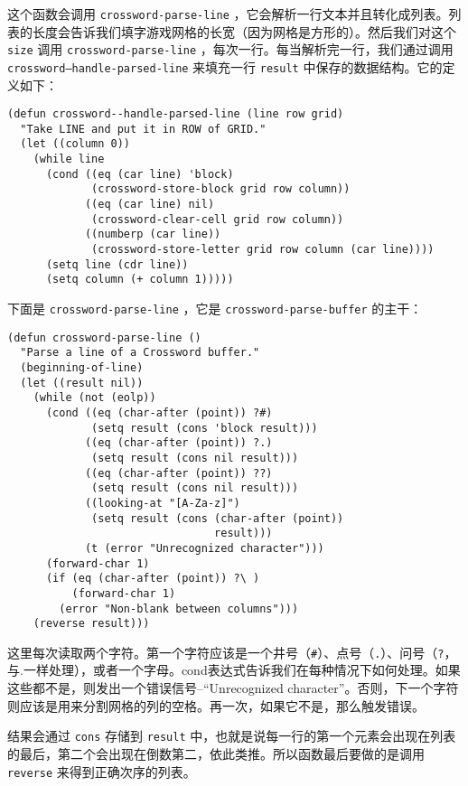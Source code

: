 这个函数会调用 \texttt{crossword-parse-line} ，它会解析一行文本并且转化成列表。列表的长度会告诉我们填字游戏网格的长宽（因为网格是方形的）。然后我们对这个 \texttt{size} 调用 \texttt{crossword-parse-line} ，每次一行。每当解析完一行，我们通过调用 \texttt{crossword--handle-parsed-line} 来填充一行 \texttt{result} 中保存的数据结构。它的定义如下：

\begin{verbatim}
(defun crossword--handle-parsed-line (line row grid)
  "Take LINE and put it in ROW of GRID."
  (let ((column 0))
    (while line
      (cond ((eq (car line) 'block)
             (crossword-store-block grid row column))
            ((eq (car line) nil)
             (crossword-clear-cell grid row column))
            ((numberp (car line))
             (crossword-store-letter grid row column (car line))))
      (setq line (cdr line))
      (setq column (+ column 1)))))
\end{verbatim}

下面是 \texttt{crossword-parse-line} ，它是 \texttt{crossword-parse-buffer} 的主干：

\begin{verbatim}
(defun crossword-parse-line ()
  "Parse a line of a Crossword buffer."
  (beginning-of-line)
  (let ((result nil))
    (while (not (eolp))
      (cond ((eq (char-after (point)) ?#)
             (setq result (cons 'block result)))
            ((eq (char-after (point)) ?.)
             (setq result (cons nil result)))
            ((eq (char-after (point)) ??)
             (setq result (cons nil result)))
            ((looking-at "[A-Za-z]")
             (setq result (cons (char-after (point))
                                result)))
            (t (error "Unrecognized character")))
      (forward-char 1)
      (if (eq (char-after (point)) ?\ )
          (forward-char 1)
        (error "Non-blank between columns")))
    (reverse result)))
\end{verbatim}

这里每次读取两个字符。第一个字符应该是一个井号（\verb|#|）、点号（\verb|.|）、问号（\verb|?|，与.一样处理），或者一个字母。cond表达式告诉我们在每种情况下如何处理。如果这些都不是，则发出一个错误信号--“Unrecognized character”。否则，下一个字符则应该是用来分割网格的列的空格。再一次，如果它不是，那么触发错误。

结果会通过 \texttt{cons} 存储到 \texttt{result} 中，也就是说每一行的第一个元素会出现在列表的最后，第二个会出现在倒数第二，依此类推。所以函数最后要做的是调用 \texttt{reverse} 来得到正确次序的列表。

